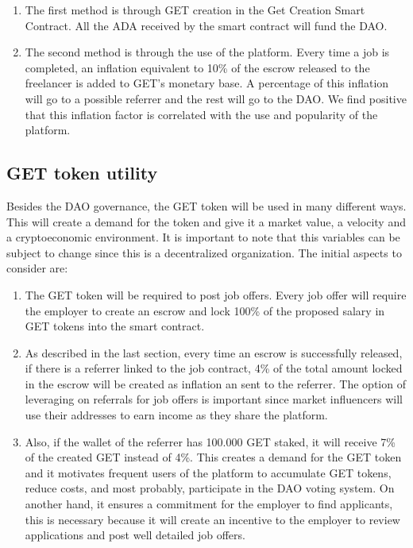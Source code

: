 \documentclass{article}
\begin{document}
\begin{enumerate}
  \item The first method is through GET creation in the Get Creation Smart Contract. All the ADA received by the smart contract will fund the DAO.
  \item The second method is through the use of the platform. Every time a job is completed, an inflation equivalent to 10\% of the escrow released to the freelancer is added to GET's monetary base. A percentage of this inflation will go to a possible referrer and the rest will go to the DAO. We find positive that this inflation factor is correlated with the use and popularity of the platform.
\end{enumerate}

\subsection{GET token utility}

Besides the DAO governance, the GET token will be used in many different ways. This will create a demand for the token and give it a market value, a velocity and a cryptoeconomic environment. It is important to note that this variables can be subject to change since this is a decentralized organization. The initial aspects to consider are:

\begin{enumerate}
\item The GET token will be required to post job offers. Every job offer will require the employer to create an escrow and lock 100\% of the proposed salary in GET tokens into the smart contract.
\item As described in the last section, every time an escrow is successfully released, if there is a referrer linked to the job contract, 4\% of the total amount locked in the escrow will be created as inflation an sent to the referrer. The option of leveraging on referrals for job offers is important since market influencers will use their addresses to earn income as they share the platform.
\item Also, if the wallet of the referrer has 100.000 GET staked, it will receive 7\% of the created GET instead of 4\%. This creates a demand for the GET token and it motivates frequent users of the platform to accumulate GET tokens, reduce costs, and most probably, participate in the DAO voting system. On another hand, it ensures a commitment for the employer to find applicants, this is necessary because it will create an incentive to the employer to review applications and post well detailed job offers.
\end{enumerate}
\end{document}
